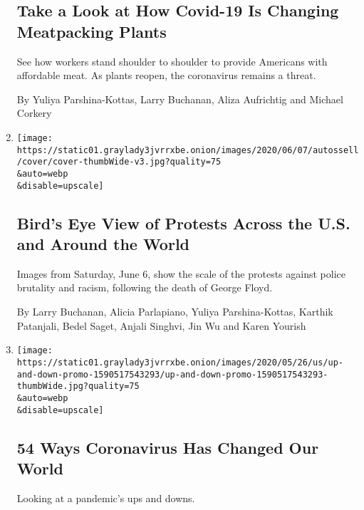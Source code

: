 \begin{enumerate}
  \hypertarget{take-a-look-at-how-covid-19-is-changing-meatpacking-plants}{%
  \subsection{Take a Look at How Covid-19 Is Changing Meatpacking
  Plants}\label{take-a-look-at-how-covid-19-is-changing-meatpacking-plants}}

  See how workers stand shoulder to shoulder to provide Americans with
  affordable meat. As plants reopen, the coronavirus remains a threat.

  By Yuliya Parshina-Kottas, Larry Buchanan, Aliza Aufrichtig and
  Michael Corkery
\item
  \href{/interactive/2020/06/07/us/george-floyd-protest-aerial-photos.html}{}

  \texttt{[image: https://static01.graylady3jvrrxbe.onion/images/2020/06/07/autossell/cover/cover-thumbWide-v3.jpg?quality=75\\\&auto=webp\\\&disable=upscale]}

  \hypertarget{birds-eye-view-of-protests-across-the-us-and-around-the-world}{%
  \subsection{Bird's Eye View of Protests Across the U.S. and Around the
  World}\label{birds-eye-view-of-protests-across-the-us-and-around-the-world}}

  Images from Saturday, June 6, show the scale of the protests against
  police brutality and racism, following the death of George Floyd.

  By Larry Buchanan, Alicia Parlapiano, Yuliya Parshina-Kottas, Karthik
  Patanjali, Bedel Saget, Anjali Singhvi, Jin Wu and Karen Yourish
\item
  \href{/interactive/2020/05/27/sunday-review/coronavirus-effects.html}{}

  \texttt{[image: https://static01.graylady3jvrrxbe.onion/images/2020/05/26/us/up-and-down-promo-1590517543293/up-and-down-promo-1590517543293-thumbWide.jpg?quality=75\\\&auto=webp\\\&disable=upscale]}

  \hypertarget{54-ways-coronavirus-has-changed-our-world}{%
  \subsection{54 Ways Coronavirus Has Changed Our
  World}\label{54-ways-coronavirus-has-changed-our-world}}

  Looking at a pandemic's ups and downs.


\end{enumerate}
